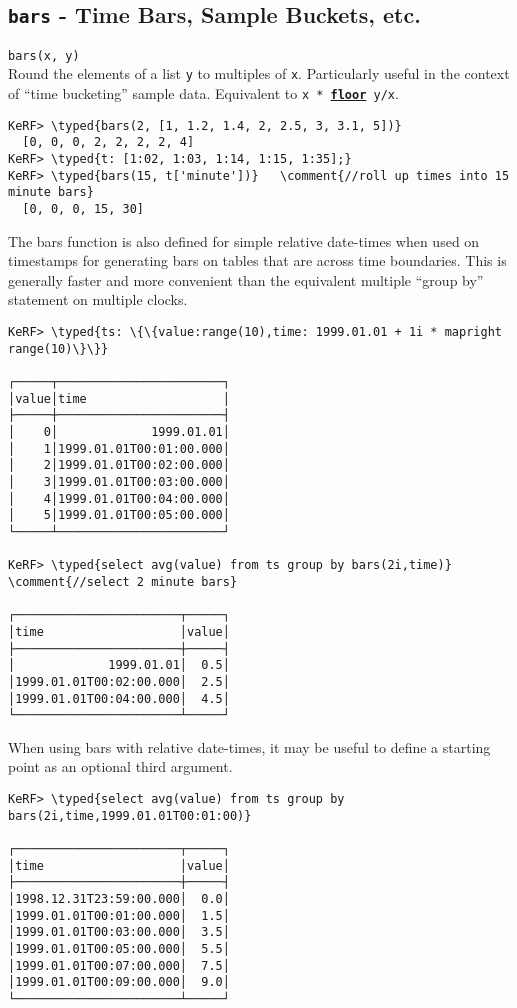 \documentclass{article}
\newcommand{\typed}[1]{\textcolor{TealBlue}{#1}}
\newcommand{\comment}[1]{\textcolor{Orange}{#1}}
\newcommand{\primdefu}[3]{\subsection{\texttt{#1} - #2}\label{prim:#3}}
\newcommand{\primu}[2]{\hyperref[prim:#2]{\textbf{\texttt{#1}}}}
\newcommand{\primdef}[2]{\primdefu{#1}{#2}{#1}}
\newcommand{\prim}[1]{\primu{#1}{#1}}
\begin{document}
\pagebreak
\primdef{bars}{Time Bars, Sample Buckets, etc.}
\texttt{bars(x, y)}\\

Round the elements of a list \texttt{y} to multiples of \texttt{x}. Particularly useful in the context of ``time bucketing'' sample data. Equivalent to \texttt{x * \prim{floor} y/x}.
\begin{Verbatim}
KeRF> \typed{bars(2, [1, 1.2, 1.4, 2, 2.5, 3, 3.1, 5])}
  [0, 0, 0, 2, 2, 2, 2, 4]
KeRF> \typed{t: [1:02, 1:03, 1:14, 1:15, 1:35];}
KeRF> \typed{bars(15, t['minute'])}   \comment{//roll up times into 15 minute bars}
  [0, 0, 0, 15, 30]
\end{Verbatim}

The bars function is also defined for simple relative date-times when used on timestamps for generating bars on tables that are across time boundaries. This is generally faster and more convenient than the equivalent multiple ``group by'' statement on multiple clocks.
\begin{Verbatim}
KeRF> \typed{ts: \{\{value:range(10),time: 1999.01.01 + 1i * mapright  range(10)\}\}}

┌─────┬───────────────────────┐
│value│time                   │
├─────┼───────────────────────┤
│    0│             1999.01.01│
│    1│1999.01.01T00:01:00.000│
│    2│1999.01.01T00:02:00.000│
│    3│1999.01.01T00:03:00.000│
│    4│1999.01.01T00:04:00.000│
│    5│1999.01.01T00:05:00.000│
└─────┴───────────────────────┘

KeRF> \typed{select avg(value) from ts group by bars(2i,time)} \comment{//select 2 minute bars}

┌───────────────────────┬─────┐
│time                   │value│
├───────────────────────┼─────┤
│             1999.01.01│  0.5│
│1999.01.01T00:02:00.000│  2.5│
│1999.01.01T00:04:00.000│  4.5│
└───────────────────────┴─────┘
\end{Verbatim}

When using bars with relative date-times, it may be useful to define a starting point as an optional third argument. 

\begin{Verbatim}
KeRF> \typed{select avg(value) from ts group by bars(2i,time,1999.01.01T00:01:00)}

┌───────────────────────┬─────┐
│time                   │value│
├───────────────────────┼─────┤
│1998.12.31T23:59:00.000│  0.0│
│1999.01.01T00:01:00.000│  1.5│
│1999.01.01T00:03:00.000│  3.5│
│1999.01.01T00:05:00.000│  5.5│
│1999.01.01T00:07:00.000│  7.5│
│1999.01.01T00:09:00.000│  9.0│
└───────────────────────┴─────┘
\end{Verbatim}
\end{document}
